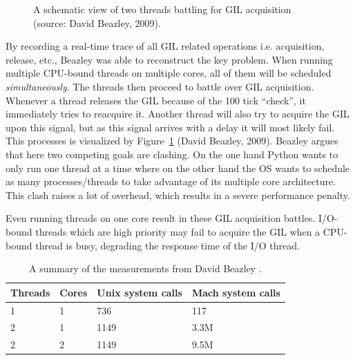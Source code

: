  \begin{figure}[h]
 	\caption{A schematic view of two threads battling for GIL acquisition (source: David Beazley, 2009).}
 	\label{fig:gil_battle_threads}
 \end{figure}

By recording a real-time trace of all GIL related operations i.e. acquisition, release, etc., Beazley was able to reconstruct the key problem.
When running multiple CPU-bound threads on multiple cores, all of them will be scheduled \emph{simultaneously}.
The threads then proceed to battle over GIL acquisition. 
Whenever a thread releases the GIL because of the 100 tick \enquote{check}, it immediately tries to reacquire it.
Another thread will also try to acquire the GIL upon this signal, but as this signal arrives with a delay it will most likely fail.
This processes is visualized by Figure~\ref{fig:gil_battle_threads} (David Beazley, 2009).
Beazley argues that here two competing goals are clashing.
On the one hand Python wants to only run one thread at a time where on the other hand the OS wants to schedule as many processes/threads to take advantage of its multiple core architecture.
This clash raises a lot of overhead, which results in a severe performance penalty.

Even running threads on one core result in these GIL acquisition battles.
I/O-bound threads which are high priority may fail to acquire the GIL when a CPU-bound thread is busy, degrading the response time of the I/O thread.

\begin{table}[]
	\centering
	\caption{A summary of the measurements from David Beazley \cite{beazley2009inside}.}
	\label{tbl:system_calls_thread_switching}
	\begin{tabular}{|l|l|l|l|}
		\hline
	\textbf{Threads}	& \textbf{Cores} & \textbf{Unix system calls} & \textbf{Mach system calls} \\ \hline
	1	& 1 & 736 & 117 \\ \hline
	2	& 1 & 1149 & 3.3M \\ \hline
	2	& 2 & 1149 & 9.5M \\ \hline
	\end{tabular}
\end{table}

